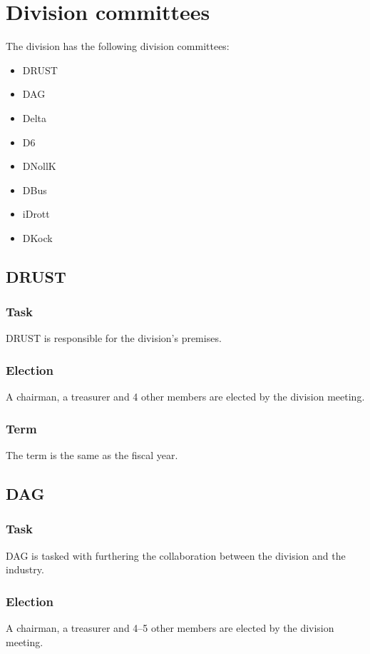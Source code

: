 \section{Division committees}

The division has the following division committees:

\begin{itemize}
  \item DRUST 
  \item DAG 
  \item Delta 
  \item D6 
  \item DNollK
  \item DBus
  \item iDrott
  \item DKock
\end{itemize}

\subsection{DRUST} 

\subsubsection{Task}
DRUST is responsible for the division's premises. 

\subsubsection{Election}
A chairman, a treasurer and 4 other members are elected by the division meeting. 

\subsubsection{Term}
The term is the same as the fiscal year. 

\subsection{DAG}

\subsubsection{Task}
DAG is tasked with furthering the collaboration between the division and the industry. 

\subsubsection{Election}
A chairman, a treasurer and 4--5 other members are elected by the division meeting. 

